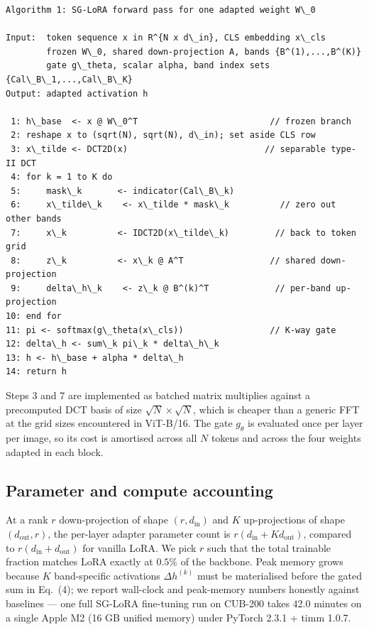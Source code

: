 \documentclass{article}
\begin{document}
\begin{verbatim}
Algorithm 1: SG-LoRA forward pass for one adapted weight W\_0

Input:  token sequence x in R^{N x d\_in}, CLS embedding x\_cls
        frozen W\_0, shared down-projection A, bands {B^(1),...,B^(K)}
        gate g\_theta, scalar alpha, band index sets {Cal\_B\_1,...,Cal\_B\_K}
Output: adapted activation h

 1: h\_base  <- x @ W\_0^T                          // frozen branch
 2: reshape x to (sqrt(N), sqrt(N), d\_in); set aside CLS row
 3: x\_tilde <- DCT2D(x)                           // separable type-II DCT
 4: for k = 1 to K do
 5:     mask\_k       <- indicator(Cal\_B\_k)
 6:     x\_tilde\_k    <- x\_tilde * mask\_k          // zero out other bands
 7:     x\_k          <- IDCT2D(x\_tilde\_k)         // back to token grid
 8:     z\_k          <- x\_k @ A^T                 // shared down-projection
 9:     delta\_h\_k    <- z\_k @ B^(k)^T             // per-band up-projection
10: end for
11: pi <- softmax(g\_theta(x\_cls))                 // K-way gate
12: delta\_h <- sum\_k pi\_k * delta\_h\_k
13: h <- h\_base + alpha * delta\_h
14: return h
\end{verbatim}

Steps 3 and 7 are implemented as batched matrix multiplies against a precomputed DCT basis of size $\sqrt{N} \times \sqrt{N}$, which is cheaper than a generic FFT at the grid sizes encountered in ViT-B/16. The gate $g_\theta$ is evaluated once per layer per image, so its cost is amortised across all $N$ tokens and across the four weights adapted in each block.

\subsection{Parameter and compute accounting}

At a rank $r$ down-projection of shape $(r, d_{\text{in}})$ and $K$ up-projections of shape $(d_{\text{out}}, r)$, the per-layer adapter parameter count is $r (d_{\text{in}} + K d_{\text{out}})$, compared to $r(d_{\text{in}} + d_{\text{out}})$ for vanilla LoRA. We pick $r$ such that the total trainable fraction matches LoRA exactly at $0.5\%$ of the backbone. Peak memory grows because $K$ band-specific activations $\Delta h^{(k)}$ must be materialised before the gated sum in Eq.~(4); we report wall-clock and peak-memory numbers honestly against baselines — one full SG-LoRA fine-tuning run on CUB-200 takes 42.0 minutes on a single Apple M2 (16 GB unified memory) under PyTorch 2.3.1 + timm 1.0.7.
\end{document}
